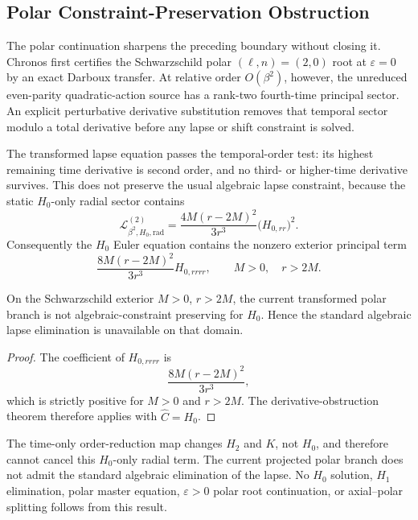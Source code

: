 \subsection{Polar Constraint-Preservation Obstruction}

The polar continuation sharpens the preceding boundary without closing it.
Chronos first certifies the Schwarzschild polar
\((\ell,n)=(2,0)\) root at \(\varepsilon=0\) by an exact Darboux transfer.
At relative order \(O(\beta^2)\), however, the unreduced even-parity
quadratic-action source has a rank-two fourth-time principal sector.  An
explicit perturbative derivative substitution removes that temporal sector
modulo a total derivative before any lapse or shift constraint is solved.

The transformed lapse equation passes the temporal-order test: its highest
remaining time derivative is second order, and no third- or higher-time
derivative survives.  This does not preserve the usual algebraic lapse
constraint, because the static \(H_0\)-only radial sector contains
\[
\mathcal L^{(2)}_{\beta^2,H_0,\mathrm{rad}}
=
\frac{4M{(r-2M)}^2}{3r^3}{\bigl(H_{0,rr}\bigr)}^2.
\]
Consequently the \(H_0\) Euler equation contains the nonzero exterior
principal term
\[
\frac{8M{(r-2M)}^2}{3r^3}H_{0,rrrr},
\qquad M>0,\quad r>2M.
\]

\begin{theorem}
On the Schwarzschild exterior \(M>0\), \(r>2M\), the current transformed polar
branch is not algebraic-constraint preserving for \(H_0\). Hence the standard
algebraic lapse elimination is unavailable on that domain.
\end{theorem}

\begin{proof}
The coefficient of \(H_{0,rrrr}\) is
\[
\frac{8M{(r-2M)}^2}{3r^3},
\]
which is strictly positive for \(M>0\) and \(r>2M\). The derivative-obstruction
theorem therefore applies with \(\widehat C=H_0\).
\end{proof}

\begin{remark}
The time-only order-reduction map changes \(H_2\) and \(K\), not \(H_0\), and
therefore cannot cancel this \(H_0\)-only radial term.  The current projected
polar branch does not admit the standard algebraic elimination of the lapse.
No \(H_0\) solution, \(H_1\) elimination, polar master equation,
\(\varepsilon>0\) polar root continuation, or axial--polar splitting follows
from this result.
\end{remark}

